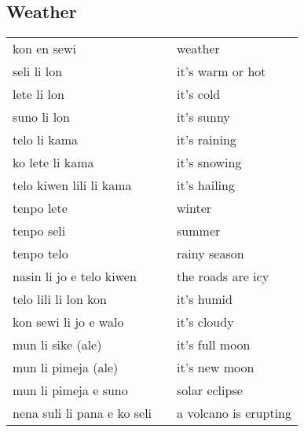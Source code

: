 \subsection{Weather}
%
\begin{supertabular}{p{4,5cm}|ll}
kon en sewi && weather \\

seli li lon && it's warm or hot \\
lete li lon && it's cold \\
suno li lon && it's sunny \\
telo li kama && it's raining \\ 
ko lete li kama && it's snowing \\
telo kiwen lili li kama && it's hailing \\
tenpo lete && winter \\
tenpo seli && summer \\
tenpo telo && rainy season \\
nasin li jo e telo kiwen && the roads are icy \\
telo lili li lon kon && it's humid \\
kon sewi li jo e walo && it's cloudy \\
mun li sike (ale) && it's full moon \\
mun li pimeja (ale) && it's new moon \\
mun li pimeja e suno && solar eclipse \\
nena suli li pana e ko seli && a volcano is erupting \\
\end{supertabular} \\
%
%
%

